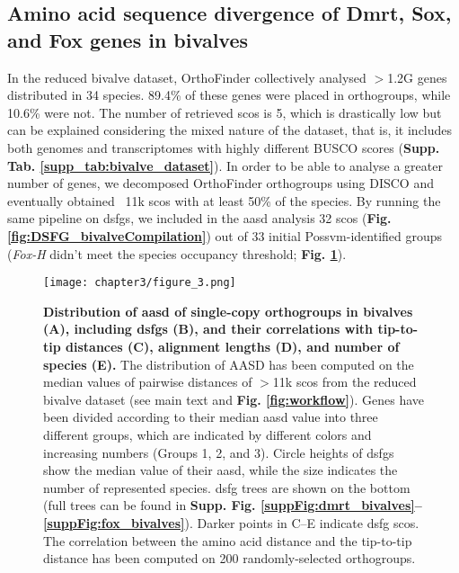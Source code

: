 \documentclass[../main.tex]{subfiles}
\begin{document}
\subsection{Amino acid sequence divergence of Dmrt, Sox, and Fox genes in bivalves}
In the reduced bivalve dataset, OrthoFinder collectively analysed $>$1.2G genes distributed in 34 species. 89.4\% of these genes were placed in orthogroups, while 10.6\% were not. The number of retrieved \glspl{sco} is 5, which is drastically low but can be explained considering the mixed nature of the dataset, that is, it includes both genomes and transcriptomes with highly different BUSCO scores (\textbf{Supp. Tab. \ref{supp_tab:bivalve_dataset}}). In order to be able to analyse a greater number of genes, we decomposed OrthoFinder orthogroups using DISCO and eventually obtained ~11k \glspl{sco} with at least 50\% of the species. By running the same pipeline on \glspl{dsfg}, we included in the \gls{aasd} analysis 32 \glspl{sco} (\textbf{Fig. \ref{fig:DSFG_bivalveCompilation}}) out of 33 initial Possvm-identified groups (\textit{Fox-H} didn’t meet the species occupancy threshold; \textbf{Fig. \ref{fig:DSFG_bivalveDivergence}}).

\begin{figure}
	\centering
	\texttt{[image: chapter3/figure\_3.png]}
	\captionsetup{width=\textwidth}
	\caption{
		\textbf{Distribution of \gls{aasd} of single-copy orthogroups in bivalves (A), including \glspl{dsfg} (B), and their correlations with tip-to-tip distances (C), alignment lengths (D), and number of species (E).} The distribution of AASD has been computed on the median values of pairwise distances of $>$11k \glspl{sco} from the reduced bivalve dataset (see main text and \textbf{Fig. \ref{fig:workflow}}). Genes have been divided according to their median \gls{aasd} value into three different groups, which are indicated by different colors and increasing numbers (Groups 1, 2, and 3). Circle heights of \glspl{dsfg} show the median value of their \gls{aasd}, while the size indicates the number of represented species. \gls{dsfg} trees are shown on the bottom (full trees can be found in \textbf{Supp. Fig. \ref{suppFig:dmrt_bivalves}--\ref{suppFig:fox_bivalves}}). Darker points in C--E indicate \gls{dsfg} \glspl{sco}. The correlation between the amino acid distance and the tip-to-tip distance has been computed on 200 randomly-selected orthogroups.
	}
	\label{fig:DSFG_bivalveDivergence}
\end{figure}
\end{document}
